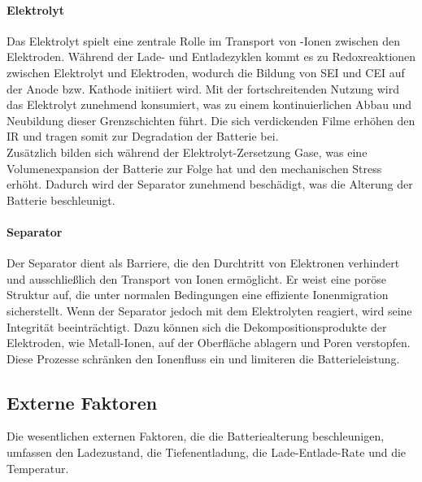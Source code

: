 \paragraph{Elektrolyt} Das Elektrolyt spielt eine zentrale Rolle im Transport von -Ionen zwischen den Elektroden. Während der Lade- und Entladezyklen kommt es zu Redoxreaktionen zwischen Elektrolyt und Elektroden, wodurch die Bildung von \acs{SEI} und \acs{CEI} auf der Anode bzw. Kathode initiiert wird. Mit der fortschreitenden Nutzung wird das Elektrolyt zunehmend konsumiert, was zu einem kontinuierlichen Abbau und Neubildung dieser Grenzschichten führt. Die sich verdickenden Filme erhöhen den \acs{IR} und tragen somit zur Degradation der Batterie bei.\\
Zusätzlich bilden sich während der Elektrolyt-Zersetzung Gase, was eine Volumenexpansion der Batterie zur Folge hat und den mechanischen Stress erhöht. Dadurch wird der Separator zunehmend beschädigt, was die Alterung der Batterie beschleunigt.

\paragraph{Separator} Der Separator dient als Barriere, die den Durchtritt von Elektronen verhindert und ausschließlich den Transport von Ionen ermöglicht. Er weist eine poröse Struktur auf, die unter normalen Bedingungen eine effiziente Ionenmigration sicherstellt. Wenn der Separator jedoch mit dem Elektrolyten reagiert, wird seine Integrität beeinträchtigt. Dazu können sich die Dekompositionsprodukte der Elektroden, wie Metall-Ionen, auf der Oberfläche ablagern und Poren verstopfen. Diese Prozesse schränken den Ionenfluss ein und limiteren die Batterieleistung. 

\subsection{Externe Faktoren}

Die wesentlichen externen Faktoren, die die Batteriealterung beschleunigen, umfassen den Ladezustand, die Tiefenentladung, die Lade-Entlade-Rate und die Temperatur.

